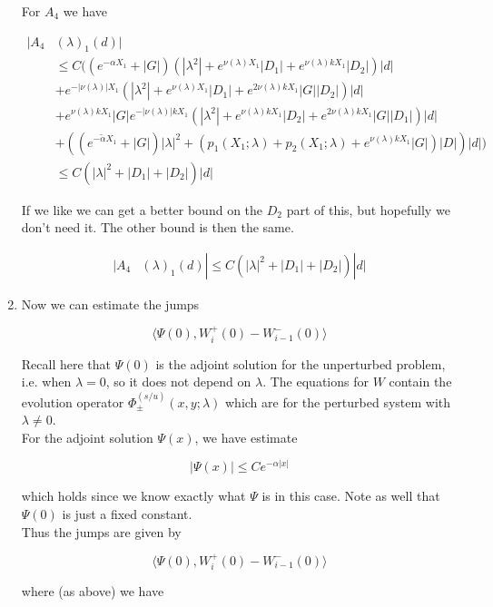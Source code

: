 \documentclass[12pt]{article}
\begin{document}
\begin{enumerate}
For $A_4$ we have

\begin{align*}
|A_4&(\lambda)_1(d)| \\
&\leq C( (e^{-\alpha X_1} + |G|) (|\lambda^2| + e^{\nu(\lambda) X_1}|D_1| + e^{\nu(\lambda)k X_1}|D_2|)|d| \\
&+ e^{-|\nu(\lambda)| X_1} (|\lambda^2| + e^{\nu(\lambda) X_1}|D_1| + e^{2 \nu(\lambda)k X_1}|G||D_2|)|d|\\
&+ e^{\nu(\lambda) k X_1} |G| e^{-|\nu(\lambda)| k X_1} (|\lambda^2| + e^{\nu(\lambda)k X_1}|D_2| + e^{2 \nu(\lambda)k X_1}|G||D_1|)|d|\\
&+ ((e^{-\tilde{\alpha} X_1} + |G|) |\lambda|^2 + (p_1(X_1; \lambda) + p_2(X_1; \lambda) + e^{\nu(\lambda)k X_1} |G|)|D|)|d| ) \\
&\leq C(|\lambda|^2 + |D_1| + |D_2| )|d|
\end{align*}

If we like we can get a better bound on the $D_2$ part of this, but hopefully we don't need it. The other bound is then the same.

\begin{align*}
|A_4&(\lambda)_1(d)| \leq C(|\lambda|^2 + |D_1| + |D_2| )|d|
\end{align*}

\item Now we can estimate the jumps

\[
\langle \Psi(0), W_i^+(0) - W_{i-1}^-(0) \rangle 
\]

Recall here that $\Psi(0)$ is the adjoint solution for the unperturbed problem, i.e. when $\lambda = 0$, so it does not depend on $\lambda$. The equations for $W$ contain the evolution operator $\Phi^{(s/u)}_\pm(x, y; \lambda)$ which are for the perturbed system with $\lambda \neq 0$.\\

For the adjoint solution $\Psi(x)$, we have estimate 

\[
|\Psi(x)| \leq C e^{-\alpha|x|}
\]

which holds since we know exactly what $\Psi$ is in this case. Note as well that $\Psi(0)$ is just a fixed constant.\\

Thus the jumps are given by

\[
\langle \Psi(0), W_i^+(0) - W_{i-1}^-(0) \rangle 
\]

where (as above) we have


\end{enumerate}
\end{document}
